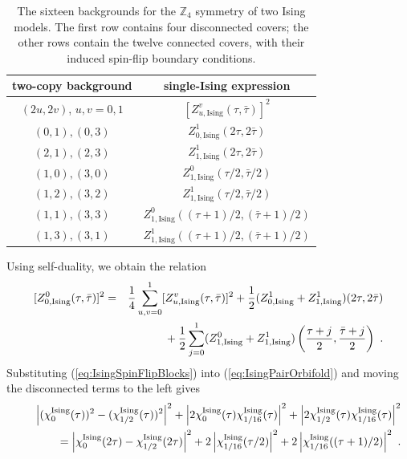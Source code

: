 \documentclass[12pt]{article}
\numberwithin{equation}{section}
\newcommand{\bea}{\begin{eqnarray}}
\newcommand{\eea}{\end{eqnarray}}
\def\no{\nonumber}
\def\ZZ{\mathbb{Z}}
\theoremstyle{remark}
\begin{document}
\begin{table}[t]
\hypersetup{citecolor=red,linkcolor=red,urlcolor=red}
\centering
\renewcommand{\arraystretch}{1.25}
\begin{tabular}{cc}
\toprule
two-copy background & single-Ising expression \\
\midrule
$(2u,2v)$, $u,v=0,1$ & $[Z^v_{u,\mathrm{Ising}}(\tau,\bar\tau)]^2$ \\
$(0,1),(0,3)$ & $Z^1_{0,\mathrm{Ising}}(2\tau,2\bar\tau)$ \\
$(2,1),(2,3)$ & $Z^1_{1,\mathrm{Ising}}(2\tau,2\bar\tau)$ \\
$(1,0),(3,0)$ & $Z^0_{1,\mathrm{Ising}}(\tau/2,\bar\tau/2)$ \\
$(1,2),(3,2)$ & $Z^1_{1,\mathrm{Ising}}(\tau/2,\bar\tau/2)$ \\
$(1,1),(3,3)$ & $Z^0_{1,\mathrm{Ising}}((\tau+1)/2,(\bar\tau+1)/2)$ \\
$(1,3),(3,1)$ & $Z^1_{1,\mathrm{Ising}}((\tau+1)/2,(\bar\tau+1)/2)$ \\
\bottomrule
\end{tabular}
\caption{The sixteen backgrounds for the $\ZZ_4$ symmetry of two Ising models. The first row contains four disconnected covers; the other rows contain the twelve connected covers, with their induced spin-flip boundary conditions. }
\label{tab:IsingPairCovers}
\end{table}

Using self-duality, we obtain the relation
\bea \label{eq:IsingPairOrbifold}
[Z^0_{0,\mathrm{Ising}}(\tau,\bar\tau)]^2
&=&{1\over4}\sum_{u,v=0}^1[Z^v_{u,\mathrm{Ising}}(\tau,\bar\tau)]^2 +{1\over2}(Z^1_{0,\mathrm{Ising}}+Z^1_{1,\mathrm{Ising}})(2\tau,2\bar\tau)\no\\
&&{}+{1\over2}\sum_{j=0}^1(Z^0_{1,\mathrm{Ising}}+Z^1_{1,\mathrm{Ising}})\left({\tau+j\over2},{\bar\tau+j\over2}\right)~.
\eea
Substituting (\ref{eq:IsingSpinFlipBlocks}) into (\ref{eq:IsingPairOrbifold}) and moving the disconnected terms to the left gives
\bea \label{eq:IsingPairNormIdentity}
&&\left|(\chi^{\mathrm{Ising}}_0(\tau))^2-(\chi^{\mathrm{Ising}}_{1/2}(\tau))^2\right|^2
+\left|2\chi^{\mathrm{Ising}}_0(\tau)\chi^{\mathrm{Ising}}_{1/16}(\tau)\right|^2+\left|2\chi^{\mathrm{Ising}}_{1/2}(\tau)\chi^{\mathrm{Ising}}_{1/16}(\tau)\right|^2\no\\
&&\hspace{0.4 in}=\left|\chi^{\mathrm{Ising}}_0(2\tau)-\chi^{\mathrm{Ising}}_{1/2}(2\tau)\right|^2
+2\left|\chi^{\mathrm{Ising}}_{1/16}(\tau/2)\right|^2+2\left|\chi^{\mathrm{Ising}}_{1/16}((\tau+1)/2)\right|^2~.
\eea
\end{document}
